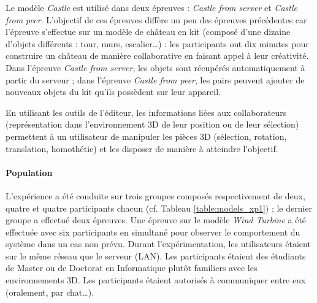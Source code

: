 Le modèle \textit{Castle} est utilisé dans deux épreuves : 
\textit{Castle from server} et \textit{Castle from peer}. L'objectif de ces épreuves
diffère un peu des épreuves précédentes car l'épreuve s'effectue sur un  modèle 
de château en kit (composé d'une dizaine d'objets différents : tour, murs, 
escalier\dots) : les 
participants ont dix minutes pour construire un 
château de manière collaborative en faisant appel à leur créativité. 
Dans l'épreuve \textit{Castle from server}, les objets sont récupérés 
automatiquement à partir du serveur ; 
dans l'épreuve \textit{Castle from peer}, les pairs peuvent ajouter de nouveaux 
objets du kit qu'ils possèdent sur leur appareil.

En utilisant les outils de l'éditeur, les informations liées aux collaborateurs 
(représentation dans l'environnement \gls{3D} de leur position ou de leur sélection) permettent à un 
utilisateur de manipuler les pièces 3D (sélection, rotation, translation, 
homothétie) et les disposer de manière à atteindre l'objectif. 
\paragraph{Population}
L'expérience a été conduite sur trois groupes composés respectivement de deux, 
quatre et quatre
participants chacun (cf. Tableau \ref{table:models_xp1}) ; le dernier groupe a 
effectué deux épreuves. Une épreuve sur le 
modèle \textit{Wind Turbine} a été effectuée avec six participants 
en simultané pour observer le comportement du système dans un cas non prévu.
Durant l'expérimentation, les utilisateurs étaient sur le même réseau que le serveur 
(\gls{LAN}). 
Les participants étaient des étudiants de Master ou de Doctorat en Informatique 
plutôt familiers avec les environnements \gls{3D}. Les participants étaient 
autorisés à 
communiquer entre eux (oralement, par chat\dots).
